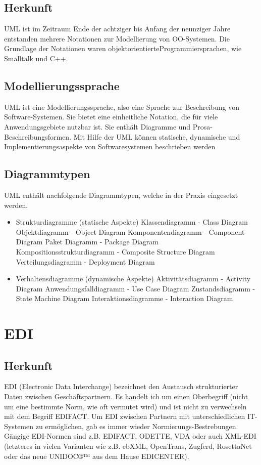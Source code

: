 	\subsection{Herkunft}
		UML ist im Zeitraum Ende der achtziger bis Anfang der neunziger Jahre entstanden mehrere Notationen zur Modellierung von OO-Systemen. Die Grundlage der Notationen waren objektorientierteProgrammiersprachen, wie Smalltalk und C++. 
	
	\subsection{Modellierungssprache}
		UML ist eine Modellierungssprache, also eine Sprache zur Beschreibung von Software-Systemen. Sie bietet eine einheitliche Notation, die für viele Anwendungsgebiete nutzbar ist. Sie enthält Diagramme und Prosa-Beschreibungsformen. Mit Hilfe der UML können statische, dynamische und Implementierungsaspekte von Softwaresystemen beschrieben werden
	
	\subsection{Diagrammtypen}
		UML enthält nachfolgende Diagrammtypen, welche in der Praxis eingesetzt werden.
		\begin{itemize}
			\item Strukturdiagramme (statische Aspekte)
				\subitem Klassendiagramm - Class Diagram
				\subitem Objektdiagramm - Object Diagram
				\subitem Komponentendiagramm - Component Diagram
				\subitem Paket Diagramm - Package Diagram
				\subitem Kompositionsstrukturdiagramm - Composite Structure Diagram
				\subitem Verteilungsdiagramm - Deployment Diagram
				
			\item Verhaltensdiagramme (dynamische Aspekte)
				\subitem Aktivitätsdiagramm - Activity Diagram
				\subitem Anwendungsfalldiagramm - Use Case Diagram
				\subitem Zustandsdiagramm - State Machine Diagram
				\subitem Interaktionsdiagramme - Interaction Diagram
		\end{itemize}
		
\section{EDI}
	\subsection{Herkunft}
		EDI (Electronic Data Interchange) bezeichnet den Austausch strukturierter Daten zwischen Geschäftspartnern. Es handelt ich um einen Oberbegriff (nicht um eine bestimmte Norm, wie oft vermutet wird) und ist nicht zu verwechseln mit dem Begriff EDIFACT. Um EDI zwischen Partnern mit unterschiedlichen IT-Systemen zu ermöglichen, gab es immer wieder Normierungs-Bestrebungen. Gängige EDI-Normen sind z.B. EDIFACT, ODETTE, VDA oder auch XML-EDI (letzteres in vielen Varianten wie z.B. ebXML, OpenTrans, Zugferd, RosettaNet oder das neue UNIDOC®™ aus dem Hause EDICENTER).
		
